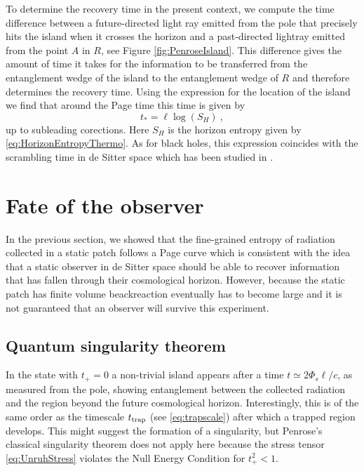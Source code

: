 \documentclass[a4paper,11pt]{article}
\newcommand{\beq}{\begin{equation}}
\newcommand{\eeq}{\end{equation}}
\numberwithin{equation}{section}
\begin{document}
To determine the recovery time in the present context, we compute the time difference between a future-directed light ray emitted from the pole that precisely hits the island when it crosses the horizon and a past-directed lightray emitted from the point $A$ in $R$, see Figure \ref{fig:PenroseIsland}. This difference gives the amount of time it takes for the information to be transferred from the entanglement wedge of the island to the entanglement wedge of $R$ and therefore determines the recovery time. Using the expression for the location of the island we find that around the Page time this time is given by
\beq
t_* = \ell \log(S_H) ~,
\eeq
up to subleading corections. Here $S_H$ is the horizon entropy given by \eqref{eq:HorizonEntropyThermo}. As for black holes, this expression coincides with the scrambling time in de Sitter space which has been studied in \cite{Susskind:2011ap,Aalsma:2020aib,Blommaert:2020tht,Bhattacharyya:2020kgu,Haque:2020pmp,Bedroya:2020rmd,Lehners:2020pem,Sybesma:2020fxg}.


\section{Fate of the observer} \label{sec:fate}
%
In the previous section, we showed that the fine-grained entropy of radiation collected in a static patch follows a Page curve which is consistent with the idea that a static observer in de Sitter space should be able to recover information that has fallen through their cosmological horizon. However, because the static patch has finite volume beackreaction eventually has to become large and it is not guaranteed that an observer will survive this experiment.


\subsection{Quantum singularity theorem}
%
In the state with $t_+=0$ a non-trivial island appears after a time $t\simeq 2\Phi_s\ell /c$, as measured from the pole, showing entanglement between the collected radiation and the region beyond the future cosmological horizon. Interestingly, this is of the same order as the timescale $t_{\rm trap}$ (see \eqref{eq:trapscale}) after which a trapped region develops. This might suggest the formation of a singularity, but Penrose's classical singularity theorem \cite{Hawking:1973uf} does not apply here because the stress tensor \eqref{eq:UnruhStress} violates the Null Energy Condition for $t_+^2<1$.
\end{document}
